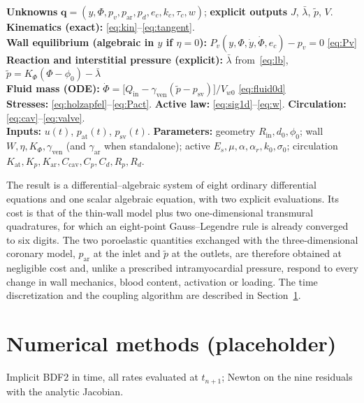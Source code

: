 \documentclass[11pt,a4paper]{article}
\newcommand{\Rin}{R_{\mathrm{in}}}
\newcommand{\lb}{\bar\lambda}
\newcommand{\pf}{\tilde p}
\newcommand{\Vw}{V_{w0}}
\begin{document}
\begin{tcolorbox}[title=Reduced poroelastic ventricle: state and equations]
\textbf{Unknowns} $\mathbf q=(y,\Phi,p_v,p_{\mathrm{ar}},p_d,e_c,k_c,\tau_c,w)$; \textbf{explicit outputs} $J$, $\lb$, $\pf$, $V$.\\[2pt]
\textbf{Kinematics (exact):} \eqref{eq:kin}--\eqref{eq:tangent}.\\
\textbf{Wall equilibrium (algebraic in $y$ if $\eta=0$):} $P_v(y,\Phi,\dot y,\dot\Phi,e_c)-p_v=0$ \hfill \eqref{eq:Pv}\\
\textbf{Reaction and interstitial pressure (explicit):} $\lb$ from~\eqref{eq:lb}, $\pf=K_\Phi(\Phi-\phi_0)-\lb$\\
\textbf{Fluid mass (ODE):} $\dot\Phi=\big[Q_{\mathrm{in}}-\gamma_{\mathrm{ven}}(\pf-p_{\mathrm{sv}})\big]/\Vw$ \hfill \eqref{eq:fluid0d}\\
\textbf{Stresses:} \eqref{eq:holzapfel}--\eqref{eq:Pact}.\quad
\textbf{Active law:} \eqref{eq:sig1d}--\eqref{eq:w}.\quad
\textbf{Circulation:} \eqref{eq:cav}--\eqref{eq:valve}.\\[2pt]
\textbf{Inputs:} $u(t)$, $p_{\mathrm{at}}(t)$, $p_{\mathrm{sv}}(t)$.\quad
\textbf{Parameters:} geometry $\Rin,d_0,\phi_0$; wall $W,\eta,K_\Phi,\gamma_{\mathrm{ven}}$ (and $\gamma_{\mathrm{ar}}$ when standalone); active $E_s,\mu,\alpha,\alpha_r,k_0,\sigma_0$; circulation $K_{\mathrm{at}},K_p,K_{\mathrm{ar}},C_{\mathrm{cav}},C_p,C_d,R_p,R_d$.
\end{tcolorbox}

The result is a differential--algebraic system of eight ordinary differential equations and one scalar algebraic equation, with two explicit evaluations. Its cost is that of the thin-wall model plus two one-dimensional transmural quadratures, for which an eight-point Gauss--Legendre rule is already converged to six digits. The two poroelastic quantities exchanged with the three-dimensional coronary model, $p_{\mathrm{ar}}$ at the inlet and $\pf$ at the outlets, are therefore obtained at negligible cost and, unlike a prescribed intramyocardial pressure, respond to every change in wall mechanics, blood content, activation or loading. The time discretization and the coupling algorithm are described in Section~\ref{sec:numerics}.


\section{Numerical methods (placeholder)}
\label{sec:numerics}
Implicit BDF2 in time, all rates evaluated at $t_{n+1}$; Newton on the nine residuals with the analytic Jacobian.
\end{document}
